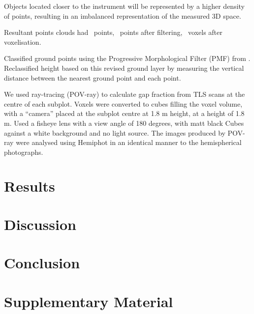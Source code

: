 \documentclass[11pt,a4paper]{article}
\newcommand{\beginsupplement}{%
	\setcounter{table}{0}
	\renewcommand{\thetable}{S\arabic{table}}%
	\setcounter{figure}{0}
	\renewcommand{\thefigure}{S\arabic{figure}}%
}
\begin{document}
Objects located closer to the instrument will be represented by a higher density
of points, resulting in an imbalanced representation of the measured 3D space.

Resultant points clouds had ~points, ~points after filtering, ~voxels after
voxelisation.

Classified ground points using the Progressive Morphological Filter (PMF) from
\citep{Zhang2003}. Reclassified height based on this revised ground layer by
measuring the vertical distance between the nearest ground point and each point.

We used ray-tracing (POV-ray) to calculate gap fraction from TLS scans at the
centre of each subplot. Voxels were converted to cubes filling the voxel volume,
with a ``camera'' placed at the subplot centre at 1.8 m height, at a height of
1.8 m. Used a fisheye lens with a view angle of 180 degrees, with matt black
Cubes against a white background and no light source. The images produced by
POV-ray were analysed using Hemiphot in an identical manner to the hemispherical
photographs.

\section{Results}

\section{Discussion}

\section{Conclusion}

\printbibliography

\section{Supplementary Material} \beginsupplement
\end{document}
